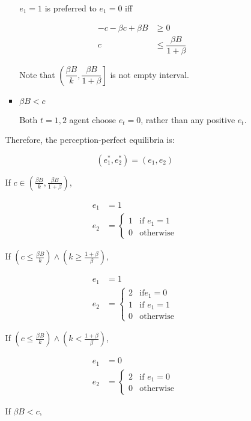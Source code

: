 \documentclass{jsarticle}
\begin{document}
\begin{enumerate}
\begin{enumerate}
\begin{itemize}
\begin{itemize}
$e_1=1$ is preferred to $e_1=0$ iff

\begin{align*}
-c - \beta c + \beta B &\geq 0 \\
c & \leq \dfrac{\beta B}{1+\beta}
\end{align*}

Note that $\left( \dfrac{\beta B}{k}, \dfrac{\beta B}{1+\beta} \right]$ is not empty interval.

\item $\beta B < c$

Both $t=1,2$ agent choose $e_t=0$, rather than any positive $e_t$.

\end{itemize}

\newpage

Therefore, the perception-perfect equilibria is:

\[(e_1^*, e_2^*)=(e_1,e_2) \]

If $c \in (\frac{\beta B}{k}, \frac{\beta B}{1+\beta})$,

\begin{align*}
e_1 &=1 \\
e_2 &=\begin{cases}
1 & \text{if } e_1=1 \\
0 & \text{otherwise}
\end{cases}
\end{align*}

If $(c \leq \frac{\beta B}{k}) \wedge (k \geq \frac{1+\beta}{\beta})$,

\begin{align*}
e_1 &=1 \\
e_2 &=\begin{cases}
2 & \text{if} e_1=0 \\
1 & \text{if } e_1=1 \\
0 & \text{otherwise}
\end{cases}
\end{align*}

If $(c \leq \frac{\beta B}{k}) \wedge (k < \frac{1+\beta}{\beta})$, 

\begin{align*}
e_1 &=0 \\
e_2 &=\begin{cases}
2 & \text{if } e_1=0 \\
0 & \text{otherwise}
\end{cases}
\end{align*}

If $\beta B < c$,


\end{itemize}
\end{enumerate}
\end{enumerate}
\end{document}
